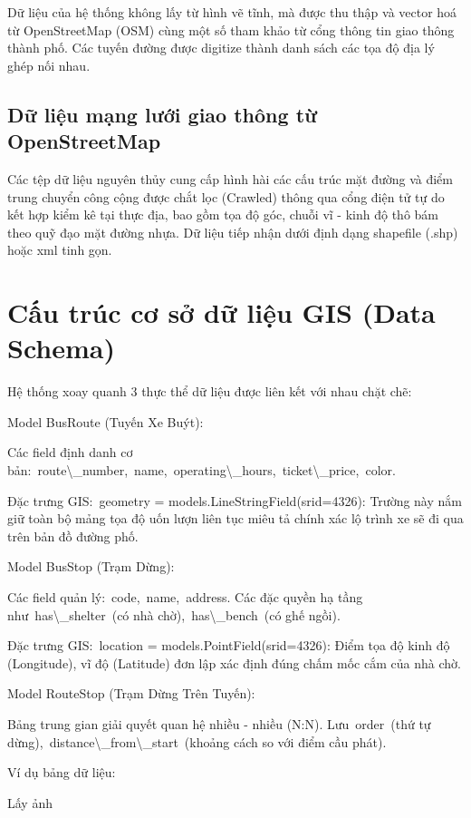 \documentclass[13pt,a4paper]{report}
\begin{document}
Dữ liệu của hệ thống không lấy từ hình vẽ tĩnh, mà được thu thập và vector hoá từ OpenStreetMap (OSM) cùng một số tham khảo từ cổng thông tin giao thông thành phố. Các tuyến đường được digitize thành danh sách các tọa độ địa lý ghép nối nhau.

\subsection{Dữ liệu mạng lưới giao thông từ OpenStreetMap}

Các tệp dữ liệu nguyên thủy cung cấp hình hài các cấu trúc mặt đường và điểm trung chuyển công cộng được chắt lọc (Crawled) thông qua cổng điện tử tự do kết hợp kiểm kê tại thực địa, bao gồm tọa độ góc, chuỗi vĩ - kinh độ thô bám theo quỹ đạo mặt đường nhựa. Dữ liệu tiếp nhận dưới định dạng shapefile (.shp) hoặc xml tinh gọn.

\section{Cấu trúc cơ sở dữ liệu GIS (Data Schema)}

Hệ thống xoay quanh 3 thực thể dữ liệu được liên kết với nhau chặt chẽ:

Model BusRoute (Tuyến Xe Buýt):

Các field định danh cơ bản: route\textbackslash{}_number, name, operating\textbackslash{}_hours, ticket\textbackslash{}_price, color.

Đặc trưng GIS: geometry = models.LineStringField(srid=4326): Trường này nắm giữ toàn bộ mảng tọa độ uốn lượn liên tục miêu tả chính xác lộ trình xe sẽ đi qua trên bản đồ đường phố.

Model BusStop (Trạm Dừng):

Các field quản lý: code, name, address. Các đặc quyền hạ tầng như has\textbackslash{}_shelter (có nhà chờ), has\textbackslash{}_bench (có ghế ngồi).

Đặc trưng GIS: location = models.PointField(srid=4326): Điểm tọa độ kinh độ (Longitude), vĩ độ (Latitude) đơn lập xác định đúng chấm mốc cắm của nhà chờ.

Model RouteStop (Trạm Dừng Trên Tuyến):

Bảng trung gian giải quyết quan hệ nhiều - nhiều (N:N). Lưu order (thứ tự dừng), distance\textbackslash{}_from\textbackslash{}_start (khoảng cách so với điểm cầu phát).

Ví dụ bảng dữ liệu:

Lấy ảnh
\end{document}
